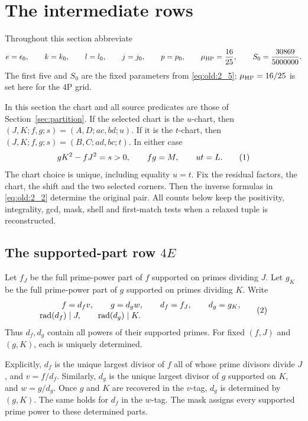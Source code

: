 \section{The intermediate rows}\label{sec:intermediate}

Throughout this section abbreviate
\[
 e=\epsilon_0,\qquad k=k_0,\qquad l=l_0,\qquad
 j=j_0,\qquad p=p_0,\qquad \mu_{\rm HP}=\frac{16}{25},\qquad
 S_0=\frac{30869}{5000000}.
\]
The first five and $S_0$ are the fixed parameters from
\eqref{eq:old:2_5}; $\mu_{\rm HP}=16/25$ is set here for the 4P grid.

In this section the chart and all source predicates are those of
Section~\ref{sec:partition}.  If the selected chart is the $u$-chart, then
$(J,K;f,g;s)=(A,D;ac,bd;u)$.  If it is the $t$-chart, then
$(J,K;f,g;s)=(B,C;ad,bc;t)$.  In either case
\begin{equation}
 gK^2-fJ^2=s>0,\qquad fg=M,\qquad ut=L.
\AutoTag{eq:old:6_1}
\end{equation}
The chart choice is unique, including equality $u=t$.  Fix the residual
factors, the chart, the shift and the two selected corners.  Then the
inverse formulas in \eqref{eq:old:2_2} determine the original pair.  All
counts below keep the positivity, integrality, gcd, mask, shell and
first-match tests when a relaxed tuple is reconstructed.

\subsection{The supported-part row $4E$}

Let $f_J$ be the full prime-power part of $f$ supported on primes dividing
$J$.  Let $g_K$ be the full prime-power part of $g$ supported on primes
dividing $K$.  Write
\[
 \begin{aligned}
 f&=d_fv,\qquad g=d_gw,\qquad d_f=f_J,\qquad d_g=g_K,\\[-2pt]
 \operatorname{rad}(d_f)&\mid J,\qquad
 \operatorname{rad}(d_g)\mid K.
 \end{aligned}                                          \AutoTag{eq:old:6_2}
\]
Thus $d_f,d_g$ contain all powers of their supported primes.  For fixed
\((f,J)\) and \((g,K)\), each is uniquely determined.

Explicitly, \(d_f\) is the unique largest divisor of \(f\) all of whose
prime divisors divide \(J\), and \(v=f/d_f\).  Similarly, \(d_g\) is the
unique largest divisor of \(g\) supported on \(K\), and \(w=g/d_g\).  Once
\(g\) and \(K\) are recovered in the \(v\)-tag, \(d_g\) is determined by
\((g,K)\).  The same holds for \(d_f\) in the \(w\)-tag.  The mask assigns
every supported prime power to these determined parts.

